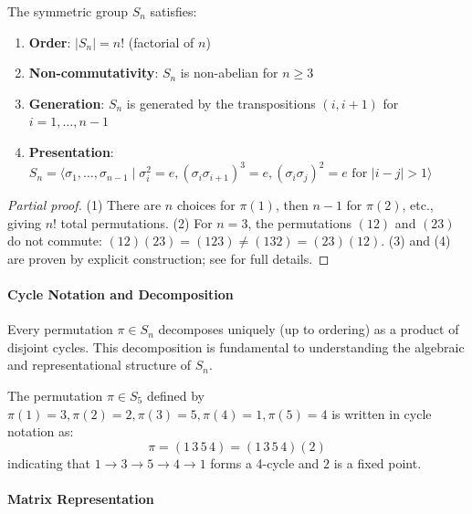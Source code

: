 \begin{proposition}\label{prop:symmetric_group_properties}
The symmetric group $S_n$ satisfies:
\begin{enumerate}
    \item \textbf{Order}: $|S_n| = n!$ (factorial of $n$)
    \item \textbf{Non-commutativity}: $S_n$ is non-abelian for $n \geq 3$
    \item \textbf{Generation}: $S_n$ is generated by the transpositions $(i, i+1)$ for $i=1,\ldots,n-1$
    \item \textbf{Presentation}: $S_n = \langle \sigma_1, \ldots, \sigma_{n-1} \mid \sigma_i^2 = e, (\sigma_i\sigma_{i+1})^3 = e, (\sigma_i\sigma_j)^2 = e \text{ for } |i-j| > 1 \rangle$
\end{enumerate}
\end{proposition}

\begin{proof}[Partial proof]
(1) There are $n$ choices for $\pi(1)$, then $n-1$ for $\pi(2)$, etc., giving $n!$ total permutations. (2) For $n=3$, the permutations $(12)$ and $(23)$ do not commute: $(12)(23) = (123) \neq (132) = (23)(12)$. (3) and (4) are proven by explicit construction; see \citep{dummit2004abstract} for full details.
\end{proof}

\paragraph{Cycle Notation and Decomposition}

Every permutation $\pi \in S_n$ decomposes uniquely (up to ordering) as a product of disjoint cycles. This decomposition is fundamental to understanding the algebraic and representational structure of $S_n$.

\begin{example}
The permutation $\pi \in S_5$ defined by $\pi(1)=3, \pi(2)=2, \pi(3)=5, \pi(4)=1, \pi(5)=4$ is written in cycle notation as:
\begin{equation}
\pi = (1\,3\,5\,4) = (1\,3\,5\,4)(2)
\end{equation}
indicating that $1 \to 3 \to 5 \to 4 \to 1$ forms a 4-cycle and $2$ is a fixed point.
\end{example}

\paragraph{Matrix Representation}

